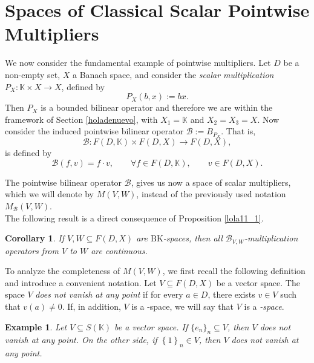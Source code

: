 \documentclass[14pt, a4paper]{article}  %
\providecommand{\llave}[1]{\left\lbrace #1\right\rbrace }
\newcommand{\K}{\mathbb{K}}
\newcommand{\BK}{\text{BK}}
\newcommand{\BKn}{\text{BKN}}
\newcommand{\BB}{\mathscr{B}}
\newtheorem{corollary}{Corollary}[section]
\newtheorem{example}{Example}[section]  %
\begin{document}
\section{Spaces of Classical Scalar Pointwise Multipliers}\label{d170}\label{pop5}  
We now consider the fundamental example of pointwise multipliers. Let $D$ be a non-empty set, $X$ a Banach space, and consider the \emph{scalar multiplication} $P_{X}:\K\times X\to X$, defined by  
\begin{equation}\label{lola17}  
P_{X}(b,x):=bx.  
\end{equation}  
Then $P_{X}$ is a bounded bilinear operator and therefore we are  within the framework of Section \ref{holadenuevo}, with $X_{1}=\K$ and $X_{2}=X_{3}=X$. Now consider the induced pointwise bilinear operator $\BB:=B_{P_{X}}$. That is,  
\begin{equation*}  
\BB:F(D,\K)\times F(D,X)\to F(D,X),   
\end{equation*}  
is defined by
\begin{equation}\label{d302_0}  
\BB(f,v)=f\cdot v, \qquad\forall f\in F(D,\K),\qquad v\in F(D,X).  
\end{equation}  

The pointwise bilinear operator $\BB$, gives us now a space of scalar multipliers, which we will denote by $M(V, W)$, instead of the previously used notation $M_{\BB}(V, W)$. \\


The following result is a direct consequence of Proposition \ref{lola11_1}.  

\begin{corollary}\label{d327_1} \label{d329_2}  
	If $V,W\subseteq F(D,X)$ are $\BK$-spaces, then all $\mathscr{B}_{V,W}$-multiplication operators from $V$ to $W$ are continuous.  
\end{corollary}  

To analyze the completeness of $M(V, W)$, we first recall the following definition and introduce a convenient notation. Let $V \subseteq F(D, X)$ be a  vector space. The space $V$ \emph{does not vanish at any point} if for every $a \in D$, there exists $v \in V$ such that $v(a) \neq 0$. If, in addition, $V$ is a \BK-space, we will say that $V$ is a \emph{\BKn-space}. 

\begin{example} Let $V \subseteq S(\K)$ be a vector space. If $\{e_n\}_{n} \subseteq V$, then $V$ does not vanish at any point. On the other side, if $\llave{1}_{n}\in V$, then $V$ does not vanish at any point.
\end{example}
\end{document}
